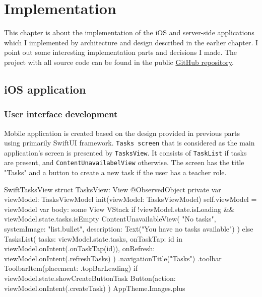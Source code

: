 \documentclass[
  biblatex = false,
  language=english,
  figures=false,
  sourcecodes,
  glossaries,
  index
]{kidiplom}
\begin{document}
\section{Implementation}
This chapter is about the implementation of the iOS and server-side applications which I implemented by architecture and design described in the earlier chapter. I point out some interesting implementation parts and decisions I made. The project with all source code can be found in the public \href{https://github.com/maxkup19/bachelor-thesis}{GitHub repository}.

\subsection{iOS application}
\subsubsection{User interface development}
Mobile application is created based on the design provided in previous parts using primarily SwiftUI framework. \texttt{Tasks screen} that is considered as the main application's screen is presented by \texttt{TasksView}. It consists of \texttt{TaskList} if tasks are present, and \texttt{ContentUnavailabelView} otherwise. The screen has the title "Tasks" and a button to create a new task if the user has a teacher role.

\begin{kicode}{Swift}{}{TasksView}
struct TasksView: View {
    @ObservedObject private var viewModel: TasksViewModel
    init(viewModel: TasksViewModel) {
        self.viewModel = viewModel
    }
    var body: some View {
        VStack {
            if !viewModel.state.isLoading && viewModel.state.tasks.isEmpty {
                ContentUnavailableView(
                    "No tasks",
                    systemImage: "list.bullet",
                    description: Text("You have no tasks available")
                )
            } else {
                TasksList(
                    tasks: viewModel.state.tasks,
                    onTaskTap: { id in viewModel.onIntent(.onTaskTap(id))},
                    onRefresh: { viewModel.onIntent(.refreshTasks) }
                )
            }
        }
        .navigationTitle("Tasks")
        .toolbar {
            ToolbarItem(placement: .topBarLeading) {
                if viewModel.state.showCreateButtonTask {
                    Button(action: { viewModel.onIntent(.createTask) }) {
                        AppTheme.Images.plus
                    }
                }
            }
        }
    }
}
\end{kicode}
\end{document}
